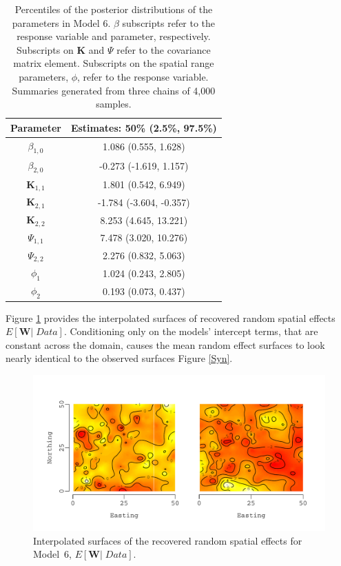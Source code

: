 \documentclass[a4paper]{article}
\newcommand{\bK}{\textbf{K}}
\newcommand{\bW}{\textbf{W}}
\begin{document}
\begin{table}[!h]
\begin{center}
\caption{Percentiles of the posterior distributions of the parameters in Model 6.  $\beta$ subscripts refer to the response variable and parameter, respectively.  Subscripts on $\bK$ and $\Psi$ refer to the covariance matrix element.  Subscripts on the spatial range parameters, $\phi$, refer to the response variable. Summaries generated from three chains of 4,000 samples.} \label{SyntheticEsts}
\begin{tabular}
[c]{|c|c|}%
\hline Parameter & Estimates: 50\% (2.5\%, 97.5\%)\\\hline
$\beta_{1,0}$ &  1.086 (0.555, 1.628)\\
$\beta_{2,0}$ &  -0.273 (-1.619, 1.157)\\
\hline
$\bK_{1,1}$ &  1.801 (0.542, 6.949)\\
$\bK_{2,1}$ & -1.784 (-3.604, -0.357)\\
$\bK_{2,2}$ &  8.253 (4.645, 13.221)\\
\hline
$\Psi_{1,1}$ & 7.478 (3.020, 10.276)\\
$\Psi_{2,2}$ & 2.276 (0.832, 5.063)\\
\hline
$\phi_{1}$ & 1.024 (0.243, 2.805)\\
$\phi_{2}$ & 0.193 (0.073, 0.437)\\
\hline
\end{tabular}
\end{center}
\end{table}

Figure \ref{SynWSurf} provides the interpolated surfaces of recovered
random spatial effects $E[\bW |\; Data]$.  Conditioning only on the
models' intercept terms, that are constant across the domain,
causes the mean random effect surfaces to look nearly identical to
the observed surfaces Figure \ref{Syn}.

\begin{figure}[h!]
\centering
\includegraphics[width=14cm]{synWSurf.pdf}
\caption{Interpolated surfaces of the recovered random spatial effects for Model~6, $E[\bW |\; Data]$.}
\label{SynWSurf}
\end{figure}
\end{document}
